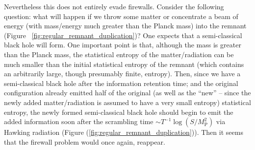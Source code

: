 \documentclass[12pt]{article}
\newcommand{\2}{$^2$}
\newcommand{\3}{$^3$}
\newcommand{\4}{$_4$}
\newcommand{\5}{$_5$}
\begin{document}
Nevertheless this does not entirely evade firewalls. Consider the following question: what will happen if we throw some matter or concentrate a beam of energy (with mass/energy much greater than the Planck mass) into the remnant (Figure ~\ref{fig:regular_remnant_duplication})? One expects that a semi-classical black hole will form. One important point is that, although the mass is greater than the Planck mass, the statistical entropy of the matter/radiation can be much smaller than the initial statistical entropy of the remnant (which contains an arbitrarily large, though presumably finite, entropy). Then, since we have a semi-classical black hole after the information retention time; and the original configuration already emitted half of the original (as well as the ``new'' -- since the newly added matter/radiation is assumed to have a very small entropy) statistical entropy, the newly formed semi-classical black hole should begin to emit the added information soon after the scrambling time $\sim T^{-1} \log (S/M_{\text{P}}^2)$ \cite{Hayden:2007cs} via Hawking radiation (Figure (\ref{fig:regular_remnant_duplication})). Then it seems that the firewall problem would once again, reappear. 
\end{document}
